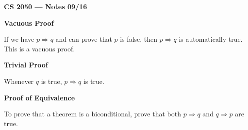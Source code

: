 \documentclass{article}
\begin{document}
\textbf{CS 2050 --- Notes 09/16}

\bigskip

\textbf{Vacuous Proof}

\medskip

If we have $p\Rightarrow q$ and can prove that $p$ is false, then $p\Rightarrow q$ is automatically true. This is a vacuous proof.

\bigskip

\textbf{Trivial Proof}

\medskip

Whenever $q$ is true, $p\Rightarrow q$ is true.

\bigskip

\textbf{Proof of Equivalence}

\medskip

To prove that a theorem is a biconditional, prove that both $p\Rightarrow q$ and $q\Rightarrow p$ are true.
\end{document}
